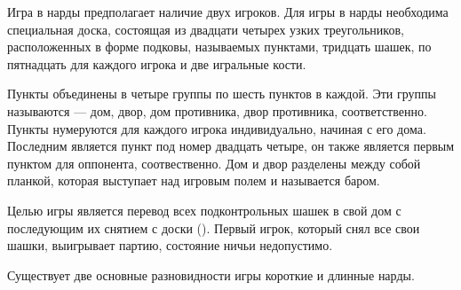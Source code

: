 Игра в нарды предполагает наличие двух игроков. Для игры в нарды необходима специальная доска, состоящая из двадцати четырех узких треугольников, расположенных в форме подковы, называемых пунктами, тридцать шашек, по пятнадцать для каждого игрока и две игральные кости.

Пункты объединены в четыре группы по шесть пунктов в каждой. Эти группы называются --- дом, двор, дом противника, двор противника, соответственно. Пункты нумеруются для каждого игрока индивидуально, начиная с его дома. Последним является пункт под номер двадцать четыре, он также является первым пунктом для оппонента, соотвественно. Дом и двор разделены между собой планкой, которая выступает над игровым полем и называется баром.

Целью игры является перевод всех подконтрольных шашек в свой дом с последующим их снятием с доски (). Первый игрок, который снял все свои шашки, выигрывает партию, состояние ничьи недопустимо.


\pagebreak

Существует две основные разновидности игры короткие и длинные нарды.
